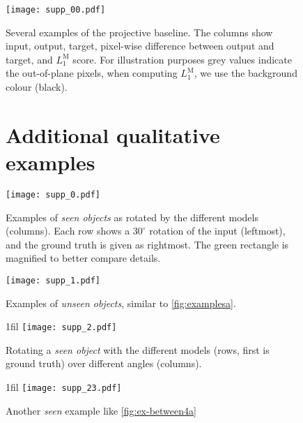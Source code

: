 \documentclass[runningheads]{llncs}
\makeatletter
\newcommand*{\centerfloat}{%
  \parindent \z@
  \leftskip \z@ \@plus 1fil \@minus \textwidth
  \rightskip\leftskip
  \parfillskip \z@skip}
\makeatother
\begin{document}
\begin{appendix}
\begin{figure}[hbtp] %
    \centering
    \texttt{[image: supp\_00.pdf]}
    \caption{
        Several examples of the projective baseline.
        The columns show input, output, target, pixel-wise difference between output and target, and $L_1^\textrm{M}$ score.
        For illustration purposes grey values indicate the out-of-plane pixels, when computing $L_1^\textrm{M}$, we use the background colour (black).
    }
    \label{fig:ex-seen0}
\end{figure}


\clearpage
\begin{landscape}
\begin{figure}[h!] %
    \section{Additional qualitative examples}
    \vspace{-4mm}
    \centering
    \texttt{[image: supp\_0.pdf]}
    \vspace{-5mm}
    \caption{
        Examples of \emph{seen objects} as rotated by the different models (columns). Each row shows a $30^\circ$ rotation of the input (leftmost), and the ground truth is given as rightmost.
        The green rectangle is magnified to better compare details.
    }
    \label{fig:examplesa}
\end{figure}

\begin{figure} %
    \centering
    \texttt{[image: supp\_1.pdf]}
    \caption{
        Examples of \emph{unseen objects}, similar to \autoref{fig:examplesa}.
    }
    \label{fig:examplesb}
\end{figure}
\end{landscape}


\begin{figure}[p] %
    \centering
    \centerfloat
    \texttt{[image: supp\_2.pdf]}
    \caption{
        Rotating a \emph{seen object} with the different models (rows, first is ground truth) over different angles (columns).
    }
    \label{fig:ex-between4a}
\end{figure}

\begin{figure}[p] %
    \centering
    \centerfloat
    \texttt{[image: supp\_23.pdf]}
    \caption{
        Another \emph{seen} example like \autoref{fig:ex-between4a}
    }
    \label{fig:ex-between4b}
\end{figure}


\end{appendix}
\end{document}
